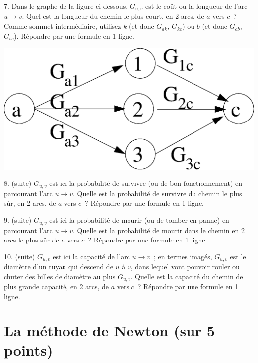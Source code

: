 \documentclass[11pt]{article}
\begin{document}
 
7. Dans le  graphe de la figure ci-dessous, $G_{u,v}$ est le coût ou la longueur de l'arc $u\rightarrow v$. Quel est la longueur du chemin le plus court, en 2 arcs, de $a$ vers $c$~? Comme sommet intermédiaire, utilisez $k$ (et donc $G_{ak}$, $G_{kc}$) ou $b$ (et donc $G_{ab}$, $G_{bc}$). Répondre par une formule en 1 ligne.

\begin{center}
\includegraphics[width=0.5\linewidth]{graphe.eps}
\end{center}
\else\fi

 
8. (suite)  $G_{u,v}$ est ici  la probabilité de survivre
(ou de bon fonctionnement) en parcourant l'arc
$u\rightarrow v$. Quelle est la probabilité de survivre du  chemin le plus sûr, en 2 arcs,
de $a$ vers $c$~?  Répondre par une formule en 1 ligne.
 

\else\fi

 
9. (suite) $G_{u,v}$ est ici   la probabilité de mourir (ou de tomber en panne) en parcourant l'arc
$u\rightarrow v$. Quelle est la probabilité de mourir dans le chemin en 2 arcs le plus sûr  de $a$ vers $c$~? Répondre par une formule en 1 ligne.

\else\fi
 

10. (suite)  $G_{u,v}$ est  ici la capacité de l'arc $u\rightarrow v$~; en termes imagés,
$G_{u,v}$ est le diamètre d'un tuyau qui descend de $u$ à $v$, dans lequel vont pouvoir rouler ou chuter  des billes de diamètre au plus $G_{u,v}$.
Quelle est la capacité du chemin de plus grande capacité,
en 2 arcs, de $a$ vers $c$~?
Répondre par une formule en 1 ligne.

\else\fi




\section{La méthode de Newton (sur 5 points)}
 
\end{document}
